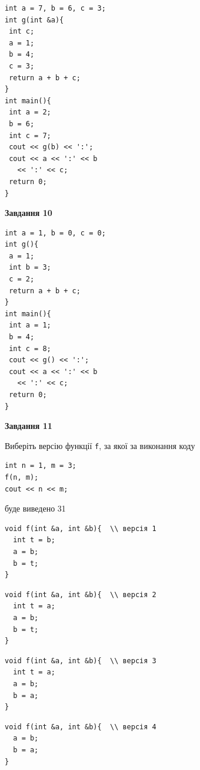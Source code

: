 \documentclass[12pt, ukrainian]{article}
\def\code#1{\Verb!#1!}
\begin{document}
{\begin {large}
\begin{minipage}[t]{7.0cm}
\begin{verbatim}
int a = 7, b = 6, c = 3;
int g(int &a){
 int c;
 a = 1;
 b = 4;
 c = 3;
 return a + b + c;
}
int main(){
 int a = 2;
 b = 6;
 int c = 7;
 cout << g(b) << ':';
 cout << a << ':' << b 
   << ':' << c;
 return 0;
}
\end{verbatim}



\begin{center}
\textbf{Завдання 10}
\end{center}
\vspace{-8mm}

\begin{verbatim}
int a = 1, b = 0, c = 0;
int g(){
 a = 1;
 int b = 3;
 c = 2;
 return a + b + c;
}
int main(){
 int a = 1;
 b = 4;
 int c = 8;
 cout << g() << ':';
 cout << a << ':' << b 
   << ':' << c;
 return 0;
}
\end{verbatim}

\end{minipage}
\vline \hspace{1mm}
\begin{minipage}[t]{11.0cm}

\begin{center}
\textbf{Завдання 11}
\end{center}
Виберіть версію функції \code{f}, за якої за виконання коду
\begin{verbatim}
int n = 1, m = 3;
f(n, m);
cout << n << m;
\end{verbatim}

буде виведено 31

\begin{verbatim}
void f(int &a, int &b){  \\ версія 1
  int t = b;
  a = b;
  b = t;
}
\end{verbatim}

\vspace{-8mm}\begin{verbatim}
void f(int &a, int &b){  \\ версія 2
  int t = a;
  a = b;
  b = t;
}
\end{verbatim}

\vspace{-8mm}\begin{verbatim}
void f(int &a, int &b){  \\ версія 3
  int t = a;
  a = b;
  b = a;
}
\end{verbatim}

\vspace{-8mm}\begin{verbatim}
void f(int &a, int &b){  \\ версія 4
  a = b;
  b = a;
}
\end{verbatim}




\end{minipage}
\end{large}}
\end{document}
